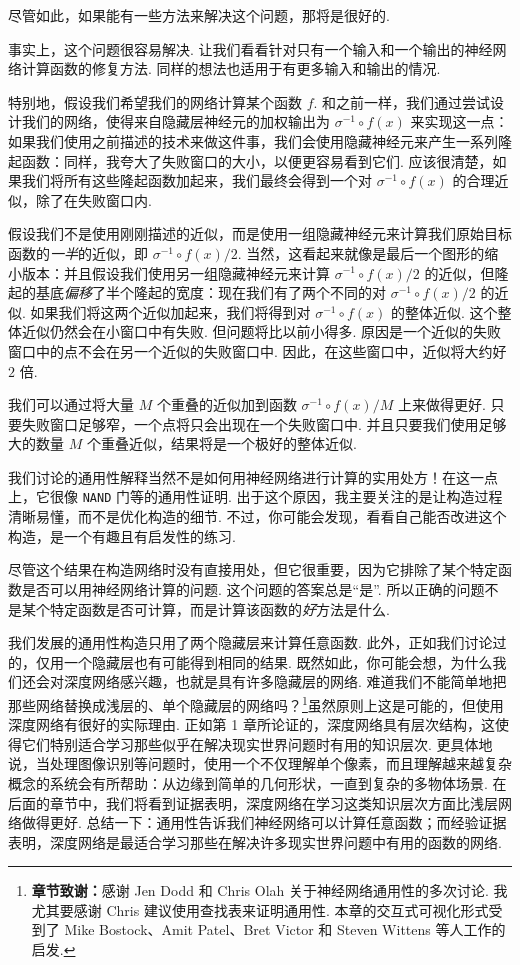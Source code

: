 尽管如此，如果能有一些方法来解决这个问题，那将是很好的.

事实上，这个问题很容易解决. 让我们看看针对只有一个输入和一个输出的神经网络计算函数的修复方法. 同样的想法也适用于有更多输入和输出的情况.

特别地，假设我们希望我们的网络计算某个函数 $f$. 和之前一样，我们通过尝试设计我们的网络，使得来自隐藏层神经元的加权输出为 $\sigma^{-1} \circ f(x)$ 来实现这一点：如果我们使用之前描述的技术来做这件事，我们会使用隐藏神经元来产生一系列隆起函数：同样，我夸大了失败窗口的大小，以便更容易看到它们. 应该很清楚，如果我们将所有这些隆起函数加起来，我们最终会得到一个对 $\sigma^{-1} \circ f(x)$ 的合理近似，除了在失败窗口内.

假设我们不是使用刚刚描述的近似，而是使用一组隐藏神经元来计算我们原始目标函数的\emph{一半}的近似，即 $\sigma^{-1} \circ f(x) / 2$. 当然，这看起来就像是最后一个图形的缩小版本：并且假设我们使用另一组隐藏神经元来计算 $\sigma^{-1} \circ f(x)/ 2$ 的近似，但隆起的基底\emph{偏移}了半个隆起的宽度：现在我们有了两个不同的对 $\sigma^{-1} \circ f(x) / 2$ 的近似. 如果我们将这两个近似加起来，我们将得到对 $\sigma^{-1} \circ f(x)$ 的整体近似. 这个整体近似仍然会在小窗口中有失败. 但问题将比以前小得多. 原因是一个近似的失败窗口中的点不会在另一个近似的失败窗口中. 因此，在这些窗口中，近似将大约好 $2$ 倍.

我们可以通过将大量 $M$ 个重叠的近似加到函数 $\sigma^{-1} \circ f(x) / M$ 上来做得更好. 只要失败窗口足够窄，一个点将只会出现在一个失败窗口中. 并且只要我们使用足够大的数量 $M$ 个重叠近似，结果将是一个极好的整体近似.

我们讨论的通用性解释当然不是如何用神经网络进行计算的实用处方！在这一点上，它很像 \texttt{NAND} 门等的通用性证明. 出于这个原因，我主要关注的是让构造过程清晰易懂，而不是优化构造的细节. 不过，你可能会发现，看看自己能否改进这个构造，是一个有趣且有启发性的练习.

尽管这个结果在构造网络时没有直接用处，但它很重要，因为它排除了某个特定函数是否可以用神经网络计算的问题. 这个问题的答案总是``是''. 所以正确的问题不是某个特定函数是否可计算，而是计算该函数的\emph{好}方法是什么.

我们发展的通用性构造只用了两个隐藏层来计算任意函数. 此外，正如我们讨论过的，仅用一个隐藏层也有可能得到相同的结果. 既然如此，你可能会想，为什么我们还会对深度网络感兴趣，也就是具有许多隐藏层的网络. 难道我们不能简单地把那些网络替换成浅层的、单个隐藏层的网络吗？\footnote{\textbf{章节致谢：}感谢 Jen Dodd 和 Chris Olah 关于神经网络通用性的多次讨论. 我尤其要感谢 Chris 建议使用查找表来证明通用性. 本章的交互式可视化形式受到了 Mike Bostock、Amit Patel、Bret Victor 和 Steven Wittens 等人工作的启发.}虽然原则上这是可能的，但使用深度网络有很好的实际理由. 正如第 1 章所论证的，深度网络具有层次结构，这使得它们特别适合学习那些似乎在解决现实世界问题时有用的知识层次. 更具体地说，当处理图像识别等问题时，使用一个不仅理解单个像素，而且理解越来越复杂概念的系统会有所帮助：从边缘到简单的几何形状，一直到复杂的多物体场景. 在后面的章节中，我们将看到证据表明，深度网络在学习这类知识层次方面比浅层网络做得更好. 总结一下：通用性告诉我们神经网络可以计算任意函数；而经验证据表明，深度网络是最适合学习那些在解决许多现实世界问题中有用的函数的网络.
